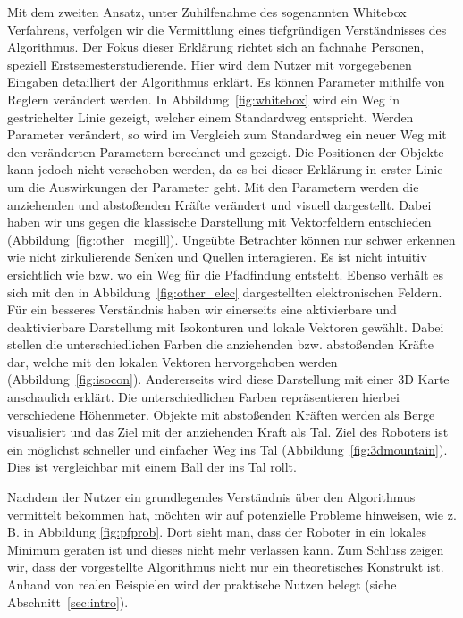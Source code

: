 Mit dem zweiten Ansatz, unter Zuhilfenahme des sogenannten Whitebox Verfahrens, verfolgen wir die Vermittlung eines tiefgründigen Verständnisses des Algorithmus. Der Fokus dieser Erklärung richtet sich an fachnahe Personen, speziell Erstsemesterstudierende. Hier wird dem Nutzer mit vorgegebenen Eingaben detailliert der Algorithmus erklärt. Es können Parameter mithilfe von Reglern verändert werden. In Abbildung~\vref{fig:whitebox} wird ein Weg in gestrichelter Linie gezeigt, welcher einem Standardweg entspricht.
Werden Parameter verändert, so wird im Vergleich zum Standardweg ein neuer Weg mit den veränderten Parametern berechnet und gezeigt. Die Positionen der Objekte kann jedoch nicht verschoben werden, da es bei dieser Erklärung in erster Linie um die Auswirkungen der Parameter geht.
Mit den Parametern werden die anziehenden und abstoßenden Kräfte verändert und visuell dargestellt. Dabei haben wir uns gegen die klassische Darstellung mit Vektorfeldern entschieden (Abbildung~\vref{fig:other_mcgill}). Ungeübte Betrachter können nur schwer erkennen wie  nicht zirkulierende Senken und Quellen \cite{munzner2015visualization} interagieren. Es ist nicht intuitiv ersichtlich wie bzw. wo ein Weg für die Pfadfindung entsteht. Ebenso  verhält es sich mit den in Abbildung~\vref{fig:other_elec} dargestellten elektronischen Feldern. Für ein besseres Verständnis haben wir  einerseits eine aktivierbare und deaktivierbare Darstellung mit Isokonturen \cite{munzner2015visualization} und lokale Vektoren gewählt. Dabei stellen die unterschiedlichen Farben die anziehenden bzw. abstoßenden Kräfte dar, welche mit den lokalen Vektoren hervorgehoben werden (Abbildung~\vref{fig:isocon}). Andererseits wird diese Darstellung mit einer 3D Karte anschaulich erklärt. Die unterschiedlichen Farben repräsentieren hierbei verschiedene Höhenmeter. Objekte mit abstoßenden Kräften werden als Berge visualisiert und das Ziel mit der anziehenden Kraft als Tal. Ziel des Roboters ist ein möglichst schneller und einfacher Weg ins Tal (Abbildung~\vref{fig:3dmountain}). Dies ist vergleichbar mit einem Ball der ins Tal rollt.



Nachdem der Nutzer ein grundlegendes Verständnis über den Algorithmus vermittelt bekommen hat, möchten wir auf potenzielle Probleme hinweisen, wie z. B. in Abbildung \vref{fig:pfprob}. Dort sieht man, dass der Roboter in ein lokales Minimum geraten ist und dieses nicht mehr verlassen kann. Zum Schluss zeigen wir, dass der vorgestellte Algorithmus nicht nur ein theoretisches Konstrukt ist. Anhand von realen Beispielen wird der praktische Nutzen belegt (siehe Abschnitt~\vref{sec:intro}).%


